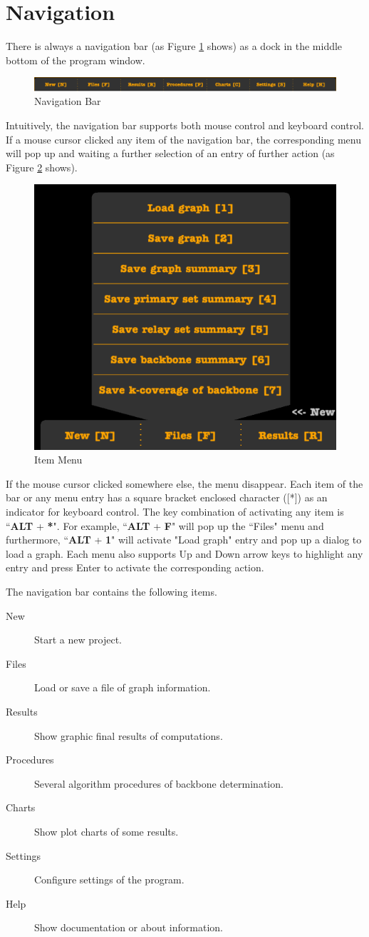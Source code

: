 \documentclass[11pt]{amsart}
\begin{document}
\section{Navigation}
There is always a navigation bar (as Figure \ref{fig:navigation} shows) as a dock in the middle bottom of the program window.
 \begin{figure}[htp]
	\centering
	\includegraphics[width=.8\linewidth]{images/Navigation.png}
	\caption{Navigation Bar}
	\label{fig:navigation}
\end{figure}
Intuitively, the navigation bar supports both mouse control and keyboard control. If a mouse cursor clicked any item of the navigation bar, the corresponding menu will pop up and waiting a further selection of an entry of further action (as Figure \ref{fig:menu} shows).
 \begin{figure}[htp]
	\centering
	\includegraphics[width=.4\linewidth]{images/Menu.png}
	\caption{Item Menu}
	\label{fig:menu}
\end{figure}
If the mouse cursor clicked somewhere else, the menu disappear. Each item of the bar or any menu entry has a square bracket enclosed character ([*]) as an indicator for keyboard control. The key combination of activating any item is ``\textbf{ALT} + \textbf{*}". For example, ``\textbf{ALT} + \textbf{F}" will pop up the ``Files" menu and furthermore, ``\textbf{ALT} + \textbf{1}" will activate "Load graph" entry and pop up a dialog to load a graph. Each menu also supports Up and Down arrow keys to highlight any entry and press Enter to activate the corresponding action.

The navigation bar contains the following items.
\begin{description}
	\item[New]Start a new project.
  	\item[Files]Load or save a file of graph information.
  	\item[Results]Show graphic final results of computations. 
  	\item[Procedures]Several algorithm procedures of backbone determination.
  	\item[Charts]Show plot charts of some results.
  	\item[Settings]Configure settings of the program.
  	\item[Help]Show documentation or about information.
\end{description}
\end{document}
